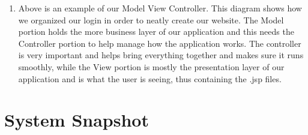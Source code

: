 \documentclass[12pt]{article}%
\begin{document}
\begin{enumerate}[5.a.]
	
	\item Above is an example of our Model View Controller. This diagram shows how we organized our login in order to neatly create our website. 
	The Model portion holds the more business layer of our application and this needs the Controller portion to help manage how the application works. 
	The controller is very important and helps bring everything together and makes sure it runs smoothly, while the View portion is mostly the presentation
	layer of our application and is what the user is seeing, thus containing the .jsp files. 

\end{enumerate}

\clearpage
\section{System Snapshot}
\end{document}
